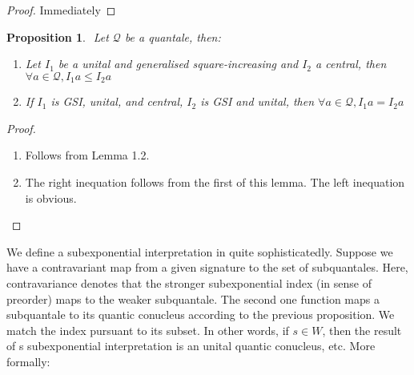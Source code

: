 \documentclass[a4paper]{article}
\theoremstyle{defin}
\theoremstyle{theorem}
\theoremstyle{prop}
\newtheorem{prop}{Proposition}
\theoremstyle{lemma}
\theoremstyle{ex}
\theoremstyle{col}
\begin{document}
\begin{proof}
  Immediately
\end{proof}

\begin{prop}
$ $
Let $\mathcal{Q}$ be a quantale, then:
\begin{enumerate}
  \item Let $I_1$ be a unital and generalised square-increasing and $I_2$ a central, then $\forall a \in \mathcal{Q}, I_1 a \leq I_2 a$
  \item If $I_1$ is GSI, unital, and central, $I_2$ is GSI and unital, then $\forall a \in \mathcal{Q}, I_1 a = I_2 a$
\end{enumerate}

\end{prop}

\begin{proof}
$ $

  \begin{enumerate}
    \item Follows from Lemma 1.2.
    \item The right inequation follows from the first of this lemma. The left inequation is obvious.
  \end{enumerate}
\end{proof}

We define a subexponential interpretation in quite sophisticatedly. Suppose we have a contravariant map from a given signature to the set of subquantales. Here, contravariance denotes that the stronger subexponential index (in sense of
preorder) maps to the weaker subquantale. The second one function maps a subquantale to its quantic conucleus according to
the previous proposition. We match the index pursuant to its subset. In other words, if $s \in W$, then the result of s
subexponential interpretation is an unital quantic conucleus, etc. More formally:
\end{document}
